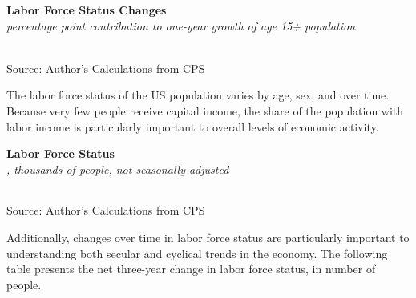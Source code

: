\documentclass{report}
\makeatletter
\newcommand{\tbllink}[1]{\href{https://raw.githubusercontent.com/bdecon/US-chartbook/master/chartbook/data/#1}{\faTable}}
\newcommand*\short[1]{\expandafter\@gobbletwo\number\numexpr#1\relax}
\newcommand{\ctsbar}[5]{
		\addplot[ybar stacked, bar width=#5, draw opacity=0, fill=#1] 
			table [x=#2, y=#3, col sep=comma]{#4};}
\newcommand{\dateaxisticks}{
		date coordinates in=x, axis line style={draw=none},
		xmax={2022-10-31},
		max space between ticks=40,	    
		xtick={{1990-01-01}, {1992-01-01}, {1994-01-01}, 
			{1996-01-01}, {1998-01-01}, {2000-01-01}, 
			{2002-01-01}, {2004-01-01}, {2006-01-01},
			{2008-01-01}, {2010-01-01}, {2012-01-01}, {2014-01-01},
		    {2016-01-01}, {2018-01-01}, {2020-01-01}, {2022-01-01}, 
		    {2024-01-01}, {2026-01-01}},
		minor xtick={{1989-01-01}, {1991-01-01}, {1993-01-01},
			{1995-01-01}, {1997-01-01}, {1999-01-01}, 
			{2001-01-01}, {2003-01-01}, {2005-01-01}, {2007-01-01},
		    {2009-01-01}, {2011-01-01}, {2013-01-01}, {2015-01-01},
		    {2017-01-01}, {2019-01-01}, {2021-01-01}, {2023-01-01}, 
		    {2025-01-01}, {2027-01-01}},
		enlarge y limits={0.06}, enlarge x limits={0.01},
		}
\newcommand{\bbar}[2]{extra #1 ticks = {{#2}}, extra #1 tick labels = ,
		extra #1 tick style = {grid=major, grid style={thick, black!25}},}
\newcommand{\rbars}{
		\fill[color=black!10] (axis cs:{1990-07-01},\pgfkeysvalueof{/pgfplots/ymin}) rectangle 
			(axis cs:{1991-03-01}, \pgfkeysvalueof{/pgfplots/ymax});
		\fill[color=black!10] (axis cs:{2007-12-01},\pgfkeysvalueof{/pgfplots/ymin}) rectangle 
			(axis cs:{2009-07-01}, \pgfkeysvalueof{/pgfplots/ymax});
		\fill[color=black!10] (axis cs:{2001-03-01},\pgfkeysvalueof{/pgfplots/ymin}) rectangle 
			(axis cs:{2001-11-01}, \pgfkeysvalueof{/pgfplots/ymax});
		\fill[color=black!10] (axis cs:{2020-02-01},\pgfkeysvalueof{/pgfplots/ymin}) rectangle 
			(axis cs:{2020-05-01}, \pgfkeysvalueof{/pgfplots/ymax});}
\makeatother
\begin{document}
{\begin{minipage}{0.76\textwidth}
\normalsize \textbf{Labor Force Status Changes}\\
\footnotesize{\textit{percentage point contribution to one-year growth of age 15+ population}}\\
\hspace*{-2mm} \\
\footnotesize{Source: Author's Calculations from CPS} \hfill \tbllink{cps_lfs2.csv}
\end{minipage}
\newpage
\begin{minipage}{0.76\textwidth}
\small The labor force status of the US population varies by age, sex, and over time. Because very few people receive capital income, the share of the population with labor income is particularly important to overall levels of economic activity. 
\vspace{2mm}

\normalsize \textbf{Labor Force Status}\\
\footnotesize{\textit{\unskip, thousands of people, not seasonally adjusted}}\\
\noindent {} \setlength{\tabcolsep}{3.0pt} \color{black!90}
		{\renewcommand{\arraystretch}{1.52}
		 \begin{tabular}{p{27.8mm} R{11.2mm} R{10.4mm} R{10.4mm} R{10.2mm} 
		 				 R{10.6mm} R{10.4mm} R{10.4mm}}
			  \hline
		\end{tabular}}
\vspace{-2mm}	
	
\footnotesize{Source: Author's Calculations from CPS}
\vspace{4mm}

\small Additionally, changes over time in labor force status are particularly important to understanding both secular and cyclical trends in the economy. The following table presents the net three-year change in labor force status, in number of people.
\vspace{2mm}


\end{minipage}}
\end{document}
